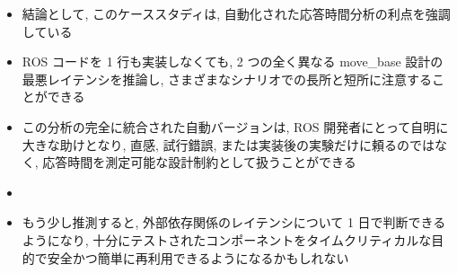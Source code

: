 \begin{frame}{}
    \begin{itemize}
        \item 結論として, このケーススタディは, 自動化された応答時間分析の利点を強調している
\item ROS コードを 1 行も実装しなくても, 2 つの全く異なる move\_base 設計の最悪レイテンシを推論し, さまざまなシナリオでの長所と短所に注意することができる
\item この分析の完全に統合された自動バージョンは, ROS 開発者にとって自明に大きな助けとなり, 直感, 試行錯誤, または実装後の実験だけに頼るのではなく, 応答時間を測定可能な設計制約として扱うことができる
\item
\item もう少し推測すると, 外部依存関係のレイテンシについて 1 日で判断できるようになり, 十分にテストされたコンポーネントをタイムクリティカルな目的で安全かつ簡単に再利用できるようになるかもしれない
    \end{itemize}
\end{frame}
